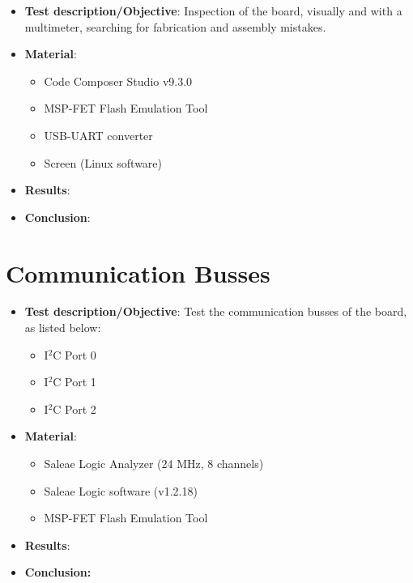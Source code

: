 \begin{itemize}
    \item \textbf{Test description/Objective}: Inspection of the board, visually and with a multimeter, searching for fabrication and assembly mistakes.
    \item \textbf{Material}:
        \begin{itemize}
            \item Code Composer Studio v9.3.0
            \item MSP-FET Flash Emulation Tool
            \item USB-UART converter
            \item Screen (Linux software)
        \end{itemize}
    \item \textbf{Results}: %
    \item \textbf{Conclusion}: %
\end{itemize}


\section{Communication Busses}

\begin{itemize}
    \item \textbf{Test description/Objective}: Test the communication busses of the board, as listed below:
        \begin{itemize}
            \item I$^{2}$C Port 0
            \item I$^{2}$C Port 1
            \item I$^{2}$C Port 2
        \end{itemize}
    \item \textbf{Material}:
        \begin{itemize}
            \item Saleae Logic Analyzer (24 MHz, 8 channels)
            \item Saleae Logic software (v1.2.18)
            \item MSP-FET Flash Emulation Tool
        \end{itemize}
    \item \textbf{Results}: %
    \item \textbf{Conclusion:} %
\end{itemize}

